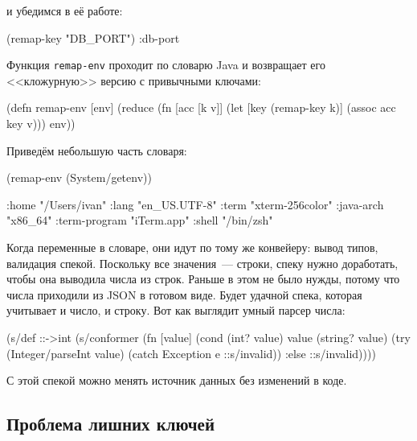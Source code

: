 \noindent
и убедимся в её работе:

\begin{english}
  \begin{clojure}
(remap-key "DB_PORT")
:db-port
  \end{clojure}
\end{english}


Функция \verb|remap-env| проходит по словарю Java и возвращает его
<<кложурную>> версию с привычными ключами:

\begin{english}
  \begin{clojure}
(defn remap-env [env]
  (reduce
   (fn [acc [k v]]
     (let [key (remap-key k)]
       (assoc acc key v)))
   {}
   env))
  \end{clojure}
\end{english}

Приведём небольшую часть словаря:

\begin{english}
  \begin{clojure}
(remap-env (System/getenv))

{:home "/Users/ivan"
 :lang "en_US.UTF-8"
 :term "xterm-256color"
 :java-arch "x86_64"
 :term-program "iTerm.app"
 :shell "/bin/zsh"}
  \end{clojure}
\end{english}

Когда переменные в словаре, они идут по тому же конвейеру: вывод типов,
валидация спекой. Поскольку все значения~--- строки, спеку нужно доработать, чтобы
она выводила числа из строк. Раньше в этом не было нужды, потому что числа
приходили из JSON в готовом виде. Будет удачной спека, которая учитывает и
число, и строку. Вот как выглядит умный парсер числа:

\begin{english}
  \begin{clojure}
(s/def ::->int
  (s/conformer
   (fn [value]
     (cond
       (int? value) value
       (string? value)
       (try (Integer/parseInt value)
            (catch Exception e
              ::s/invalid))
       :else ::s/invalid))))
  \end{clojure}
\end{english}

\noindent
С этой спекой можно менять источник данных без изменений в коде.

\subsection{Проблема лишних ключей}

